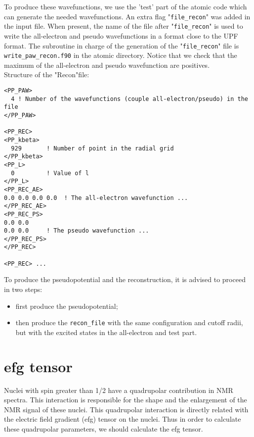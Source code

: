 \documentclass[11pt, a4paper]{article}
\begin{document}
To produce these wavefunctions, we use the 'test' part of the atomic
code which can generate the needed wavefunctions. An extra flag
"\verb+file_recon+" was added in the input file. When present, the name of
the file after "\verb+file_recon+" is used to write the all-electron and
pseudo wavefunctions in a format close to the UPF format. The
subroutine in charge of the generation of the "\verb+file_recon+" file is
\verb+write_paw_recon.f90+ in the atomic directory. Notice that we check
that the maximum of the all-electron and pseudo wavefunction are
positives.\\

Structure of the "Recon"file:
\begin{verbatim}
<PP_PAW> 
  4 ! Number of the wavefunctions (couple all-electron/pseudo) in the file 
</PP_PAW>

<PP_REC> 
<PP_kbeta> 
  929       ! Number of point in the radial grid
</PP_kbeta> 
<PP_L> 
  0         ! Value of l 
</PP_L> 
<PP_REC_AE> 
0.0 0.0 0.0 0.0  ! The all-electron wavefunction ...  
</PP_REC_AE> 
<PP_REC_PS> 
0.0 0.0
0.0 0.0     ! The pseudo wavefunction ...  
</PP_REC_PS> 
</PP_REC>

<PP_REC> ...
\end{verbatim}

To produce the pseudopotential and the reconstruction, it is advised
to proceed in two steps:
\begin{itemize}
\item first produce the pseudopotential;\\



\item then produce the \verb+recon_file+ with the same configuration and
cutoff radii, but with the excited states in the all-electron and test
part. \\



\end{itemize}

\section{efg tensor}

Nuclei with spin greater than 1/2 have a quadrupolar contribution in
NMR spectra. This interaction is responsible for the shape and the
enlargement of the NMR signal of these nuclei. This quadrupolar
interaction is directly related with the electric field gradient (efg)
tensor on the nuclei. Thus in order to calculate these quadrupolar
parameters, we should calculate the efg tensor.
\end{document}
